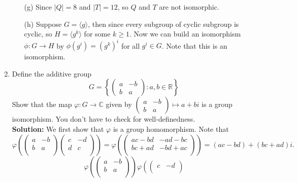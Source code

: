 \documentclass[12pt]{article}
\begin{document}
\begin{enumerate}
\begin{itemize}
        \item [(g)] Since \(\left\vert Q \right\vert = 8\) and \(\left\vert T \right\vert = 12\), so \(Q\) and \(T\) are not isomorphic.     
        \item [(h)] Suppose \(G = \langle g \rangle \), then since every subgroup of cyclic subgroup is cyclic, so \(H = \langle g^k \rangle \) for some \(k \ge 1\). Now we can build an isomorphism \(\phi :G \to H\) by \(\phi \left( g^i \right) = \left( g^k \right)^i  \) for all \(g^i \in G\). Note that this is an isomorphism.  
    \end{itemize}

    \item Define the additive group
    \[
    G=\left\{\begin{pmatrix}a&-b\\ b&a\end{pmatrix}:a,b\in\mathbb{R}\right\}
    \]
    Show that the map $\varphi:G\rightarrow\mathbb{C}$ given by $\begin{pmatrix}a&-b\\ b&a\end{pmatrix}\mapsto a+bi$ is a group isomorphism. You don't have to check for well-definedness. \\
    \textbf{Solution:} We first show that \(\varphi \) is a group homomorphism. Note that 
    \[
        \varphi \left( \begin{pmatrix}
            a & -b  \\
            b &  a \\
        \end{pmatrix} \begin{pmatrix}
            c & -d  \\
            d &  c \\
        \end{pmatrix} \right) = \varphi \left( \begin{pmatrix}
            ac - bd & -ad - bc  \\
            bc + ad & -bd + ac  \\
        \end{pmatrix} \right) = (ac - bd) + (bc + ad)i.
    \]
    \[
        \varphi \left( \begin{pmatrix}
            a & -b  \\
            b &  a \\
        \end{pmatrix} \right) \varphi \left( \begin{pmatrix}
            c & -d  \\

\end{pmatrix}\]
\end{enumerate}
\end{document}
